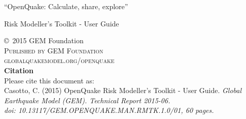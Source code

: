 \documentclass[11pt,fleqn]{book} %
\begin{document}


% 


\begingroup
\thispagestyle{empty}
\par\normalfont\fontsize{15}{15}\sffamily\selectfont
``OpenQuake: Calculate, share, explore''
\centering
\vspace*{9cm}
\par\normalfont\fontsize{35}{35}\sffamily\selectfont
Risk Modeller's Toolkit - User Guide\par %
\endgroup


\newpage
\vfill
\thispagestyle{empty}

\noindent \copyright\ 2015 GEM Foundation\\ %

\noindent \textsc{Published by GEM Foundation}\\ %

\noindent \textsc{globalquakemodel.org/openquake}\\ %

\noindent
   {\textbf{Citation}} \hfill \\
   Please cite this document as:\\
   Casotto, C. (2015) OpenQuake Risk Modeller's Toolkit - User Guide. 
   \textit{Global Earthquake Model (GEM). Technical Report 2015-06.\\ 
   doi: 10.13117/GEM.OPENQUAKE.MAN.RMTK.1.0/01, 60 pages.} \hfill \\
\end{document}
